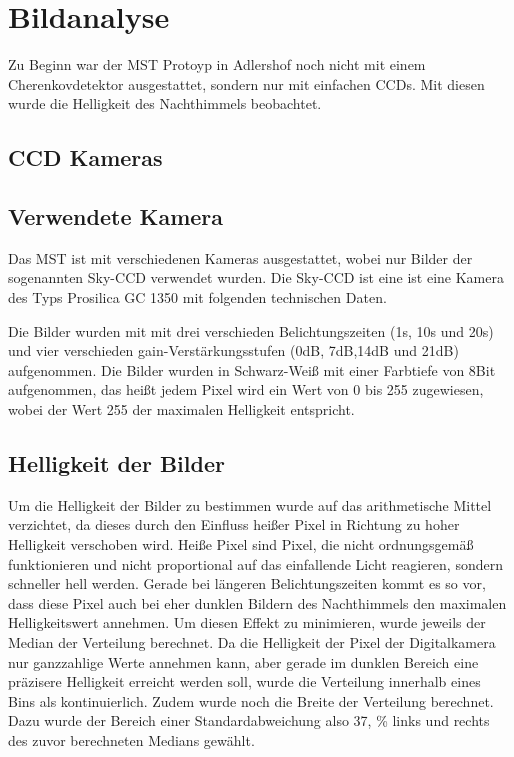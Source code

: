 \chapter{Bildanalyse}
Zu Beginn war der MST Protoyp in Adlershof noch nicht mit einem Cherenkovdetektor ausgestattet, sondern nur mit einfachen CCDs. Mit diesen wurde die Helligkeit des Nachthimmels beobachtet.

\section{CCD Kameras}

\section{Verwendete Kamera}
Das MST ist mit verschiedenen Kameras ausgestattet, wobei nur Bilder der sogenannten Sky-CCD verwendet wurden. Die Sky-CCD ist eine ist eine Kamera des Typs Prosilica GC 1350 mit folgenden technischen Daten.

Die Bilder wurden mit mit drei verschieden Belichtungszeiten (1s, 10s und 20s) und vier verschieden gain-Verstärkungsstufen (0dB, 7dB,14dB und 21dB) aufgenommen. Die Bilder wurden in Schwarz-Weiß mit einer Farbtiefe von 8Bit aufgenommen, das heißt jedem Pixel wird ein Wert von 0 bis 255 zugewiesen, wobei der Wert 255 der maximalen Helligkeit entspricht.

\section{Helligkeit der Bilder}
Um die Helligkeit der Bilder zu bestimmen wurde auf das arithmetische Mittel verzichtet, da dieses durch den Einfluss heißer Pixel in Richtung zu hoher Helligkeit verschoben wird. Heiße Pixel sind Pixel, die nicht ordnungsgemäß funktionieren und nicht proportional auf das einfallende Licht reagieren, sondern schneller hell werden. Gerade bei längeren Belichtungszeiten kommt es so vor, dass diese Pixel auch bei eher dunklen Bildern des Nachthimmels den maximalen Helligkeitswert annehmen. Um diesen Effekt zu minimieren, wurde jeweils der Median der Verteilung berechnet. Da die Helligkeit der Pixel der Digitalkamera nur ganzzahlige Werte annehmen kann, aber gerade im dunklen Bereich eine präzisere Helligkeit erreicht werden soll, wurde die Verteilung innerhalb eines Bins als kontinuierlich. Zudem wurde noch die Breite der Verteilung berechnet. Dazu wurde der Bereich einer Standardabweichung also 37, \% links und rechts des zuvor berechneten Medians gewählt.

